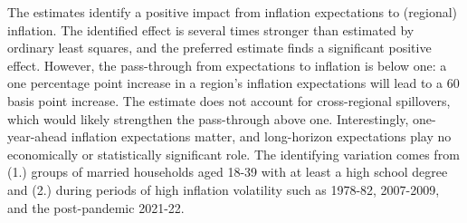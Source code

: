 \documentclass[12pt]{article}
\begin{document}
The estimates identify a positive impact from inflation expectations to (regional) inflation. The identified effect is several times stronger than estimated by ordinary least squares, and the preferred estimate finds a significant positive effect. However, the pass-through from expectations to inflation is below one: a one percentage point increase in a region's inflation expectations will lead to a 60 basis point increase. The estimate does not account for cross-regional spillovers, which would likely strengthen the pass-through above one. Interestingly, one-year-ahead inflation expectations matter, and long-horizon expectations play no economically or statistically significant role. The identifying variation comes from (1.) groups of married households aged 18-39 with at least a high school degree and (2.) during periods of high inflation volatility such as 1978-82, 2007-2009, and the post-pandemic 2021-22.

\pagebreak

%



%

%

\end{document}
